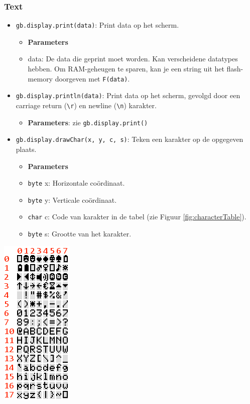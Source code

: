 \documentclass[a4paper,titlepage,12pt]{article}
\begin{document}
	\subsubsection{Text}
	\begin{minipage}{.75\textwidth}
		\begin{itemize}
			\item \texttt{gb.display.print(data)}: Print data op het scherm.
			\begin{itemize}
				\item [] \textbf{Parameters}
				\item data: De data die geprint moet worden. Kan verscheidene datatypes hebben. Om RAM-geheugen te sparen, kan je een string uit het flash-memory doorgeven met \texttt{F(data)}.
			\end{itemize}
		
			\item \texttt{gb.display.println(data)}: Print data op het scherm, gevolgd door een carriage return (\texttt{\textbackslash r}) en newline (\texttt{\textbackslash n}) karakter.
			\begin{itemize}
				\item [] \textbf{Parameters}: zie \texttt{gb.display.print()}
			\end{itemize}
		
			\item \texttt{gb.display.drawChar(x, y, c, s)}: Teken een karakter op de opgegeven plaats.
			\begin{itemize}
				\item [] \textbf{Parameters}
				\item \texttt{byte} x: Horizontale coördinaat.
				\item \texttt{byte} y: Verticale coördinaat.
				\item \texttt{char} c: Code van karakter in de tabel (zie Figuur \ref{fig:characterTable}).
				\item \texttt{byte} s: Grootte van het karakter.
			\end{itemize}
		\end{itemize}
	\end{minipage}
	\hspace{0.05\textwidth}
	\begin{minipage}{.20\textwidth}
		\centering
		\includegraphics[scale=0.6]{assets/img/font5x7}
		\label{fig:characterTable}
	\end{minipage}
\end{document}
